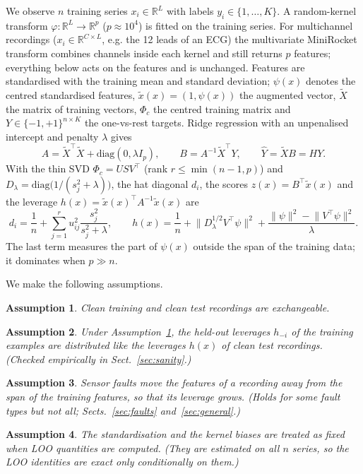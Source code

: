 \documentclass[preprint,12pt,authoryear]{elsarticle}
\newtheorem{assumption}{Assumption}
\begin{document}
We observe $n$ training series $x_i\in\mathbb{R}^L$ with labels $y_i\in\{1,\dots,K\}$. A random-kernel transform $\varphi:\mathbb{R}^L\to\mathbb{R}^p$ ($p\approx 10^4$) is fitted on the training series. For multichannel recordings ($x_i\in\mathbb{R}^{C\times L}$, e.g. the 12 leads of an ECG) the multivariate MiniRocket transform combines channels inside each kernel and still returns $p$ features; everything below acts on the features and is unchanged. Features are standardised with the training mean and standard deviation; $\psi(x)$ denotes the centred standardised features, $\tilde x(x)=(1,\psi(x))$ the augmented vector, $\tilde X$ the matrix of training vectors, $\Phi_c$ the centred training matrix and $Y\in\{-1,+1\}^{n\times K}$ the one-vs-rest targets. Ridge regression \citep{hoerl1970} with an unpenalised intercept and penalty $\lambda$ gives
\begin{equation}\label{eq:ridge}
A=\tilde X^\top\tilde X+\mathrm{diag}(0,\lambda I_p),\qquad B=A^{-1}\tilde X^\top Y,\qquad \hat Y=\tilde XB=HY .
\end{equation}
With the thin SVD $\Phi_c=USV^\top$ (rank $r\le\min(n-1,p)$) and $D_\lambda=\mathrm{diag}\big(1/(s_j^2+\lambda)\big)$, the hat diagonal $d_i$, the scores $z(x)=B^\top\tilde x(x)$ and the leverage $h(x)=\tilde x(x)^\top A^{-1}\tilde x(x)$ are
\begin{equation}\label{eq:leverage}
d_i=\frac1n+\sum_{j=1}^r u_{ij}^2\frac{s_j^2}{s_j^2+\lambda},\qquad
h(x)=\frac1n+\big\lVert D_\lambda^{1/2}V^\top\psi\big\rVert^2+\frac{\lVert\psi\rVert^2-\lVert V^\top\psi\rVert^2}{\lambda}.
\end{equation}
The last term measures the part of $\psi(x)$ outside the span of the training data; it dominates when $p\gg n$.

We make the following assumptions.
\begin{assumption}\label{as:iid} Clean training and clean test recordings are exchangeable.\end{assumption}
\begin{assumption}\label{as:lev} Under Assumption~\ref{as:iid}, the held-out leverages $h_{-i}$ of the training examples are distributed like the leverages $h(x)$ of clean test recordings. (Checked empirically in Sect.~\ref{sec:sanity}.)\end{assumption}
\begin{assumption}\label{as:fault} Sensor faults move the features of a recording away from the span of the training features, so that its leverage grows. (Holds for some fault types but not all; Sects.~\ref{sec:faults} and~\ref{sec:general}.)\end{assumption}
\begin{assumption}\label{as:fixed} The standardisation and the kernel biases are treated as fixed when LOO quantities are computed. (They are estimated on all $n$ series, so the LOO identities are exact only conditionally on them.)\end{assumption}
\end{document}
